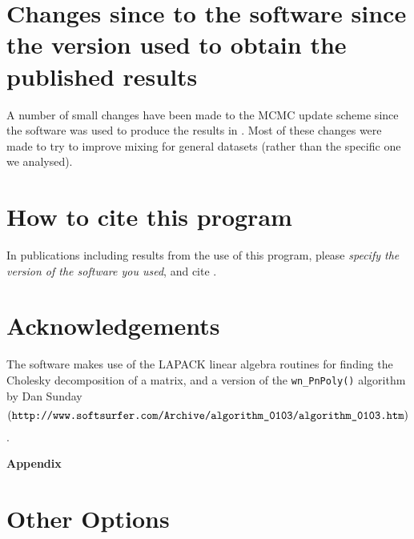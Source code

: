 \documentclass[11pt,titlepage,times,letterpaper]{article}
\begin{document}

\section{Changes since to the software since the version used to 
obtain the published results}

A number of small changes have been made to the MCMC update scheme
since the software was used to produce the results in
\cite{wasser.etal.04}.  Most of these changes were made to try to
improve mixing for general datasets (rather than the specific one we
analysed).


\section{How to cite this program}

In publications including results from the use of this program, please
{\it specify the version of the software you used}, and cite
\cite{wasser.etal.04}.


\section{Acknowledgements}

The software makes use of the LAPACK linear algebra routines for
finding the Cholesky decomposition of a matrix, and a version of the
{\tt wn\_PnPoly()} algorithm by Dan Sunday 
$$(\text{\tt http://www.softsurfer.com/Archive/algorithm\_0103/algorithm\_0103.htm})$$.


\clearpage

\appendix
\begin{centering}
{\bf Appendix}
\end{centering}

\section{Other Options}
\end{document}
